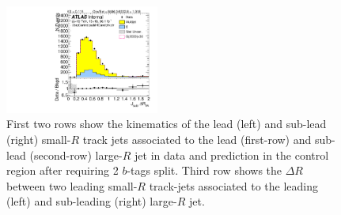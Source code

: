 \begin{figure}[htbp!]
\begin{center}
\includegraphics[angle=270, width=0.45\textwidth]{./figures/boosted/Control/b77_TwoTag_split_Control_sublHCand_trk_dr.pdf}
  \caption{First two rows show the kinematics of the lead (left) and sub-lead (right) small-$R$ track jets associated to the lead (first-row) and sub-lead (second-row) large-$R$ jet in data and prediction in the control region after requiring 2 $b$-tags split. Third row shows the $\Delta R$ between two leading small-$R$ track-jets associated to the leading (left) and sub-leading (right) large-$R$ jet.  }
  \label{fig:boosted-2bs-control-ak2}
\end{center}
\end{figure}


